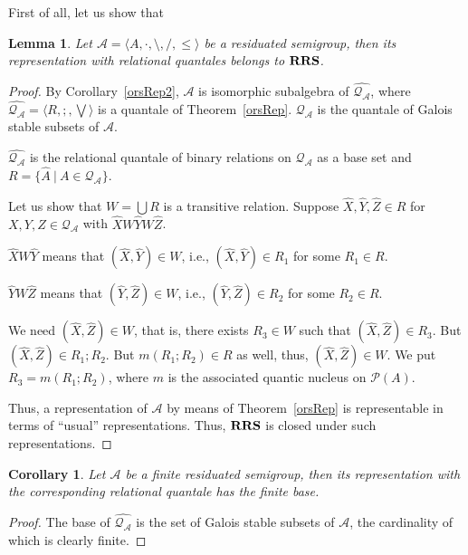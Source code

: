 \documentclass[a4paper]{article}
\theoremstyle{defin}
\theoremstyle{theorem}
\theoremstyle{prop}
\theoremstyle{lemma}
\newtheorem{lemma}{Lemma}
\theoremstyle{ex}
\theoremstyle{col}
\newtheorem{col}{Corollary}
\theoremstyle{claim}
\begin{document}
First of all, let us show that
\begin{lemma} \label{rrsLemma}
  Let $\mathcal{A} = \langle A, \cdot, \setminus, /, \leq \rangle$ be a residuated semigroup, then its representation with relational quantales belongs to ${\bf RRS}$.
\end{lemma}
\begin{proof}
  By Corollary~\ref{orsRep2}, $\mathcal{A}$ is isomorphic subalgebra of $\widehat{\mathcal{Q}_{\mathcal{A}}}$, where
  $\widehat{\mathcal{Q}_{\mathcal{A}}} = \langle R, ;, \bigvee \rangle$ is a quantale of Theorem~\ref{orsRep}.
  $\mathcal{Q}_{\mathcal{A}}$ is the quantale of Galois stable subsets of $\mathcal{A}$.

  $\widehat{\mathcal{Q}_{\mathcal{A}}}$ is the relational quantale of binary relations on $\mathcal{Q}_{\mathcal{A}}$ as a base set and
  $R = \{ \hat{A} \: | \: A \in \mathcal{Q}_{\mathcal{A}}\}$.

  Let us show that $W = \bigcup R$ is a transitive relation.
  Suppose $\widehat{X}, \widehat{Y}, \widehat{Z} \in R$ for $X, Y, Z \in \mathcal{Q}_{\mathcal{A}}$ with
  $\widehat{X} W \widehat{Y} W \widehat{Z}$.

  $\widehat{X} W \widehat{Y}$ means that $(\widehat{X}, \widehat{Y}) \in W$, i.e., $(\widehat{X}, \widehat{Y}) \in R_1$ for some
  $R_1 \in R$.

  $\widehat{Y} W \widehat{Z}$ means that $(\widehat{Y}, \widehat{Z}) \in W$, i.e., $(\widehat{Y}, \widehat{Z}) \in R_2$ for some
  $R_2 \in R$.

  We need $(\widehat{X}, \widehat{Z}) \in W$, that is, there exists $R_3 \in W$ such that $(\widehat{X}, \widehat{Z}) \in R_3$.
  But $(\widehat{X}, \widehat{Z}) \in R_1 ; R_2$. But $m(R_1 ; R_2) \in R$ as well, thus, $(\widehat{X}, \widehat{Z}) \in W$.
  We put $R_3 = m(R_1 ; R_2)$, where $m$ is the associated quantic nucleus on $\mathcal{P}(A)$.

  Thus, a representation of $\mathcal{A}$ by means of Theorem~\ref{orsRep} is representable in terms of ``usual'' representations.
  Thus, ${\bf RRS}$ is closed under such representations.
\end{proof}

\begin{col}\label{finite}
  Let $\mathcal{A}$ be a finite residuated semigroup, then its representation with the corresponding relational quantale has the finite base.
\end{col}

\begin{proof}
  The base of $\widehat{\mathcal{Q}_{\mathcal{A}}}$ is the set of Galois stable subsets of $\mathcal{A}$, the cardinality of which is clearly finite.
\end{proof}
\end{document}
